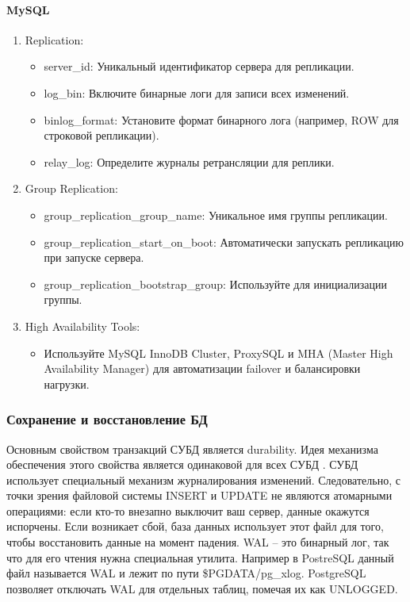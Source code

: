 \paragraph{MySQL} \cite{availability-mysql}
\begin{enumerate}
    \item Replication:
    \begin{itemize}
        \item server\_id: Уникальный идентификатор сервера для репликации.
        \item log\_bin: Включите бинарные логи для записи всех изменений.
        \item binlog\_format: Установите формат бинарного лога (например, ROW для строковой репликации).
        \item relay\_log: Определите журналы ретрансляции для реплики.
    \end{itemize}
    \item Group Replication:
    \begin{itemize}
        \item group\_replication\_group\_name: Уникальное имя группы репликации.
        \item group\_replication\_start\_on\_boot: Автоматически запускать репликацию при запуске сервера.
        \item group\_replication\_bootstrap\_group: Используйте для инициализации группы.
    \end{itemize}
    \item High Availability Tools:
    \begin{itemize}
        \item Используйте MySQL InnoDB Cluster, ProxySQL и MHA (Master High Availability Manager) для автоматизации failover и балансировки нагрузки.
    \end{itemize}
\end{enumerate}


\subsubsection{Сохранение и восстановление БД}

Основным свойством транзакций СУБД является durability. Идея механизма обеспечения этого свойства является одинаковой для всех СУБД \autocite{PostrgreSQL1}. СУБД использует специальный механизм журналирования изменений.
Следовательно, с точки зрения файловой системы INSERT и UPDATE не являются атомарными операциями: если кто-то внезапно выключит ваш сервер, данные окажутся испорчены. Если возникает сбой, база данных использует этот файл для того, чтобы восстановить данные на момент падения. WAL -- это бинарный лог, так что для его чтения нужна специальная утилита.
Например в PostreSQL данный файл называется WAL и лежит по пути \$PGDATA/pg\_xlog.
PostgreSQL позволяет отключать WAL для отдельных таблиц, помечая их как UNLOGGED.

